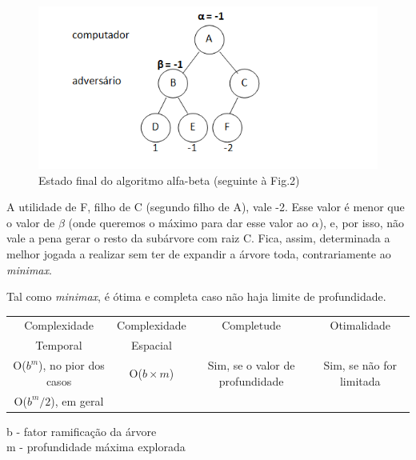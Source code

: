 \documentclass{article}
\begin{document}
\begin{figure}[H]
\begin{center}
\includegraphics[scale=0.75]{figure3.png}
\caption{Estado final do algoritmo alfa-beta (seguinte à Fig.2)}
\end{center}
\end{figure}

A utilidade de F, filho de C (segundo filho de A), vale -2. Esse valor é menor que o valor de $\beta$ (onde queremos o máximo para dar esse valor ao $\alpha$), e, por isso, não vale a pena gerar o resto da subárvore com raiz C. Fica, assim, determinada a melhor jogada a realizar sem ter de expandir a árvore toda, contrariamente ao \textit{minimax}.


Tal como \textit{minimax}, é ótima e completa caso não haja limite de profundidade.
\begin{center}
\begin{tabular}{|c|c|c|c|}
  \hline
  Complexidade & Complexidade & Completude & Otimalidade\\
  Temporal & Espacial & & \\
  \hline
  O($b^m$), no pior dos casos & O($b\times m$) & Sim, se o valor de profundidade  & Sim, se não for limitada  \\
  O($b^m/2$), em geral  &                &        &                 \\
  \hline
\end{tabular}
\end{center}
b - fator ramificação da árvore\\
m - profundidade máxima explorada
\end{document}

